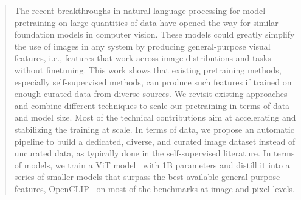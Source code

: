 \begin{abstract}
The recent breakthroughs in natural language processing for model pretraining on large quantities of data have opened the way for similar foundation models in computer vision.
These models could greatly simplify the use of images in any system by producing general-purpose visual features, i.e., features that work across image distributions and tasks without finetuning.
This work shows that existing pretraining methods, especially self-supervised methods, can produce such features if trained on enough curated data from diverse sources.
We revisit existing approaches and combine different techniques to scale our pretraining in terms of data and model size.
Most of the technical contributions aim at accelerating and stabilizing the training at scale.
In terms of data, we propose an automatic pipeline to build a dedicated, diverse, and curated image dataset instead of uncurated data, as typically done in the self-supervised literature.
In terms of models, we train a ViT model~\citep{dosovitskiy2020image} with 1B parameters and distill it into a series of smaller models that surpass the best available general-purpose features, OpenCLIP~\citep{ilharco_gabriel_2021_5143773} on most of the benchmarks at image and pixel levels. 
\end{abstract}


